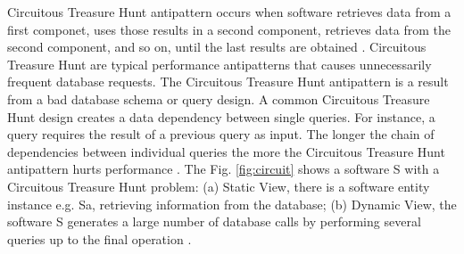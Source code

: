 \documentclass[times]{stvrauth}
\begin{document}
Circuitous Treasure Hunt antipattern occurs when software retrieves data from a first componet, uses those results in a second component, retrieves data from the second component, and so on, until the last results are obtained \cite{Smith2002} \cite{Smith2003}. Circuitous Treasure Hunt 
are typical performance antipatterns that causes unnecessarily frequent database requests. The Circuitous Treasure Hunt antipattern is a result from a bad database schema or query design. A common Circuitous Treasure Hunt design creates a data dependency between single queries. For instance, a query requires the
result of a previous query as input. The longer the chain of
dependencies between individual queries the more the Circuitous
Treasure Hunt antipattern hurts performance \cite{Wert2014}. The Fig. \ref{fig:circuit}  shows a software S with a Circuitous Treasure Hunt problem: (a) Static View, there is a software entity instance e.g. Sa, retrieving information from the database; (b) Dynamic View, the software  S generates a large number of database calls by performing several queries up to the final operation \cite{Vetoio2011}.
\end{document}
